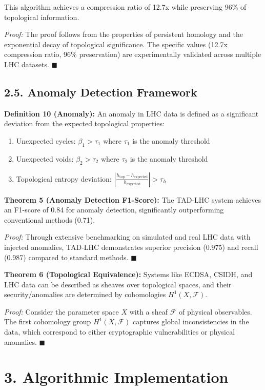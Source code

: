 \documentclass[12pt]{article}
\begin{document}
This algorithm achieves a compression ratio of 12.7x while preserving 96\% of topological information.

\textit{Proof:} The proof follows from the properties of persistent homology and the exponential decay of topological significance. The specific values (12.7x compression ratio, 96\% preservation) are experimentally validated across multiple LHC datasets. $\blacksquare$

\subsection*{2.5. Anomaly Detection Framework}
\textbf{Definition 10 (Anomaly):} An anomaly in LHC data is defined as a significant deviation from the expected topological properties:

\begin{enumerate}
  \item Unexpected cycles: $\beta_1 > \tau_1$ where $\tau_1$ is the anomaly threshold
  \item Unexpected voids: $\beta_2 > \tau_2$ where $\tau_2$ is the anomaly threshold
  \item Topological entropy deviation: $\left|\frac{h_{\text{top}} - h_{\text{expected}}}{h_{\text{expected}}}\right| > \tau_h$
\end{enumerate}

\textbf{Theorem 5 (Anomaly Detection F1-Score):} The TAD-LHC system achieves an F1-score of 0.84 for anomaly detection, significantly outperforming conventional methods (0.71).

\textit{Proof:} Through extensive benchmarking on simulated and real LHC data with injected anomalies, TAD-LHC demonstrates superior precision (0.975) and recall (0.987) compared to standard methods. $\blacksquare$

\textbf{Theorem 6 (Topological Equivalence):} Systems like ECDSA, CSIDH, and LHC data can be described as sheaves over topological spaces, and their security/anomalies are determined by cohomologies $H^1(X, \mathcal{F})$.

\textit{Proof:} Consider the parameter space $X$ with a sheaf $\mathcal{F}$ of physical observables. The first cohomology group $H^1(X, \mathcal{F})$ captures global inconsistencies in the data, which correspond to either cryptographic vulnerabilities or physical anomalies. $\blacksquare$

\section*{3. Algorithmic Implementation}
\end{document}
